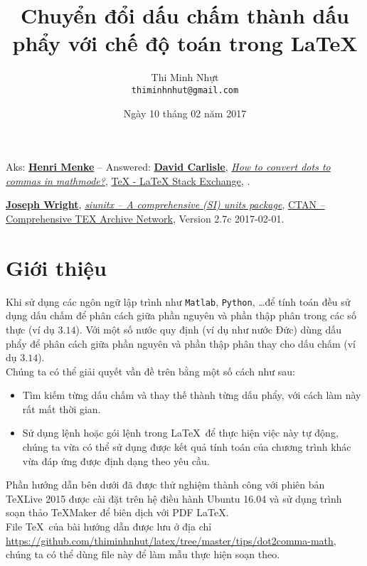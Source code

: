 \documentclass[12pt,a4paper]{article}
\title{\bfseries \huge Chuyển đổi dấu chấm thành dấu phẩy với chế độ toán trong \LaTeX}
\author{\Large Thi Minh Nhựt \bigskip \\  \Large \texttt{thiminhnhut@gmail.com}}
\date{\Large Ngày 10 tháng 02 năm 2017}
\begin{document}
\maketitle
\tableofcontents

\begin{thebibliography}{99}
	 Aks: \href{https://goo.gl/AGFMFr}{\textbf{Henri Menke}} -- Answered: \href{https://goo.gl/nl1sm9}{\textbf{David Carlisle}}, \href{https://goo.gl/ZNH6ce}{\emph{How to convert dots to commas in mathmode?}}, \href{http://tex.stackexchange.com/}{TeX - LaTeX Stack Exchange}, .
	
	 \href{https://www.ctan.org/author/wright}{\textbf{Joseph Wright}}, \href{https://www.ctan.org/pkg/siunitx}{\emph{siunitx – A comprehensive (SI) units package}}, \href{https://www.ctan.org/}{CTAN -- Comprehensive TEX Archive Network}, Version 2.7c 2017-02-01.
\end{thebibliography}

\section{Giới thiệu}
	Khi sử dụng các ngôn ngữ lập trình như \Verb|Matlab|, \Verb|Python|, \ldots để tính toán đều sử dụng dấu chấm để phân cách giữa phần nguyên và phần thập phân trong các số thực (ví dụ $3.14$). Với một số nước quy định (ví dụ như nước Đức) dùng dấu phẩy để phân cách giữa phần nguyên và phần thập phân thay cho dấu chấm (ví dụ $\num{3.14}$).\\
	
	Chúng ta có thể giải quyết vần đề trên bằng một số cách như sau:
		\begin{itemize}
			\item Tìm kiếm từng dấu chấm và thay thế thành từng dấu phẩy, với cách làm này rất mất thời gian.
			
			\item Sử dụng lệnh hoặc gói lệnh trong \LaTeX\ để thực hiện việc này tự động, chúng ta vừa có thể sử dụng được kết quả tính toán của chương trình khác vừa đáp ứng được định dạng theo yêu cầu.
		\end{itemize}
	
	Phần hướng dẫn bên dưới đã được thử nghiệm thành công với phiên bản \TeX Live 2015 được cài đặt trên hệ điều hành Ubuntu 16.04 và sử dụng trình soạn thảo \TeX Maker để biên dịch với PDF \LaTeX. \\
	
	File \TeX\ của bài hướng dẫn được lưu ở địa chỉ \url{https://github.com/thiminhnhut/latex/tree/master/tips/dot2comma-math}, chúng ta có thể dùng file này để làm mẫu thực hiện soạn theo.
	
\end{document}
